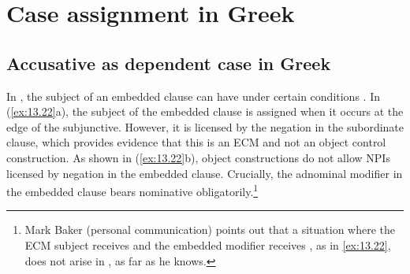 \documentclass[output=paper]{langsci/langscibook}
\begin{document}
\section{Case assignment in Greek}

\subsection{Accusative as dependent case in Greek}\largerpage[-1]

In , the subject of an embedded clause can have \Acc{} under certain
conditions \parencite{Iatridou1993,KotzPapa2007}. In (\ref{ex:13.22}a), the
subject of the embedded clause is assigned \Acc{} when it occurs at the edge of
the subjunctive. However, it is licensed by the negation in the subordinate
clause, which provides evidence that this is an \gls{ECM} and not an object
control construction. As shown in (\ref{ex:13.22}b), object 
constructions do not allow \glspl{NPI} licensed by negation in the embedded
clause.  Crucially, the adnominal modifier in the embedded clause bears
nominative obligatorily.\footnote{Mark Baker (personal
    communication) points out that a situation where the \gls{ECM} subject
receives \Acc{} and the embedded modifier receives \Nom{}, as in
\eqref{ex:13.22}, does not arise in , as far as he knows.}

\ea%
    \label{ex:13.22}
    \z
\z
\end{document}
